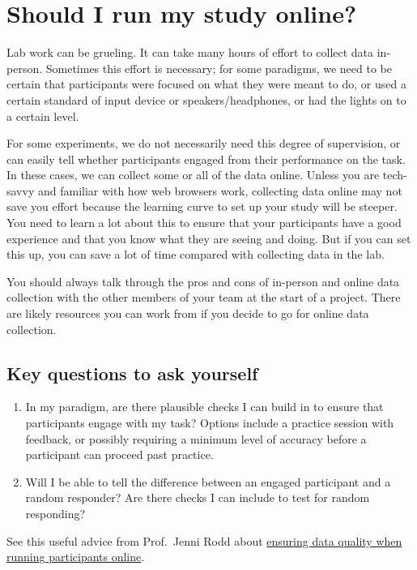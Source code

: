 \documentclass[
  12pt,
]{book}
\begin{document}
\chapter{Should I run my study online?}\label{should-i-run-my-study-online}

Lab work can be grueling. It can take many hours of effort to collect data in-person. Sometimes this effort is necessary; for some paradigms, we need to be certain that participants were focused on what they were meant to do, or used a certain standard of input device or speakers/headphones, or had the lights on to a certain level.

For some experiments, we do not necessarily need this degree of supervision, or can easily tell whether participants engaged from their performance on the task. In these cases, we can collect some or all of the data online. Unless you are tech-savvy and familiar with how web browsers work, collecting data online may not save you effort because the learning curve to set up your study will be steeper. You need to learn a lot about this to ensure that your participants have a good experience and that you know what they are seeing and doing. But if you can set this up, you can save a lot of time compared with collecting data in the lab.

You should always talk through the pros and cons of in-person and online data collection with the other members of your team at the start of a project. There are likely resources you can work from if you decide to go for online data collection.

\section{Key questions to ask yourself}\label{key-questions-to-ask-yourself}

\begin{enumerate}
\def\labelenumi{\arabic{enumi}.}
\item
  In my paradigm, are there plausible checks I can build in to ensure that participants engage with my task? Options include a practice session with feedback, or possibly requiring a minimum level of accuracy before a participant can proceed past practice.
\item
  Will I be able to tell the difference between an engaged participant and a random responder? Are there checks I can include to test for random responding?
\end{enumerate}

See this useful advice from Prof.~Jenni Rodd about \href{https://www.psychologicalscience.org/observer/how-to-maintain-data-quality-when-you-cant-see-your-participants\#.XHzv5ldcHCF.twitter}{ensuring data quality when running participants online}.
\end{document}
